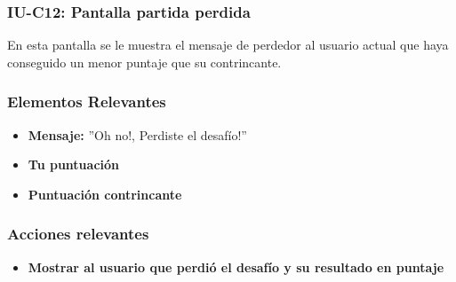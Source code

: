 
\subsubsection{IU-C12: Pantalla partida perdida}

 En esta pantalla se le muestra el mensaje de perdedor al usuario actual que haya conseguido un menor puntaje que su contrincante.


        \subsubsection{Elementos Relevantes}

            \begin{itemize}
            \item {\bf Mensaje:} ''Oh no!, Perdiste el desafío!''
            \item {\bf Tu puntuación}
            \item {\bf Puntuación contrincante}
            \end{itemize}

        \subsubsection{Acciones relevantes}

            \begin{itemize}
            \item {\bf Mostrar al usuario que perdió el desafío y su resultado en puntaje}

            \end{itemize}

        \clearpage
